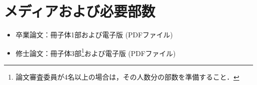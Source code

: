 \chapter{メディアおよび必要部数}
	\begin{itemize}
		\item 卒業論文：冊子体1部および電子版 (PDFファイル)
		\item 修士論文：冊子体3部\footnote{論文審査委員が4名以上の場合は，その人数分の部数を準備すること．}および電子版 (PDFファイル)
	\end{itemize}